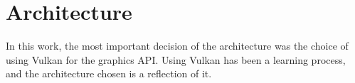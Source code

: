 \section{Architecture}
In this work, the most important decision of the architecture was the choice of using Vulkan for the graphics API. Using Vulkan has been a learning process, and the architecture chosen is a reflection of it.












